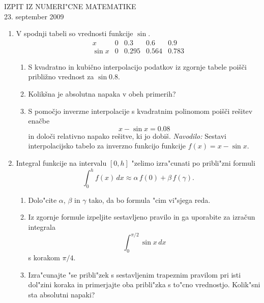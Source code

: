 

\begin{center}
	IZPIT IZ NUMERI"CNE MATEMATIKE\\
  23. september 2009
\end{center}

\vspace{1cm}

\begin{enumerate}
\item V spodnji tabeli so vrednosti funkcije $\sin$. 
         $$\begin{array}{l|rrrrr}
	      x & 0  & 0.3 & 0.6 & 0.9 \\ \hline
	      \sin x & 0 & 0.295 &   0.564  & 0.783
			\end{array}
				$$
    \begin{enumerate}
			\item S kvadratno in kubično interpolacijo podatkov iz zgornje tabele poišči približno vrednost za $\sin 0.8$.
			\item Kolikšna je absolutna napaka v obeh primerih?
			\item S pomočjo inverzne interpolacije s kvadratnim polinomom poišči rešitev enačbe
				\[x-\sin x=0.08\]
    		in določi relativno napako rešitve, ki jo dobiš.
				\emph{Navodilo:} Sestavi interpolacijsko tabelo za inverzno funkcijo funkcije $f(x)=x-\sin x$.\\ 
		\end{enumerate}
\item Integral funkcije na intervalu $[0,h]$
"zelimo izra"cunati po pribli"zni formuli
$$\int_{0}^h f(x)\,dx\approx \alpha\,f(0)+\beta\,f(\gamma).$$ 
  \begin{enumerate}
    \item Dolo"cite $\alpha$, $\beta$ in $\gamma$ tako, da bo formula
    "cim vi"sjega reda.
      
    \item Iz zgornje formule izpeljite sestavljeno pravilo in ga uporabite za izračun integrala
    $$\int_{0}^{\pi/2} \sin{x}\,dx$$
    s korakom $\pi/4$.

    \item Izra"cunajte "se pribli"zek s sestavljenim trapeznim pravilom pri isti
    dol"zini koraka in primerjajte oba pribli"zka s to"cno vrednostjo.
    Kolik"sni sta absolutni napaki?

   \end{enumerate}

\end{enumerate}


